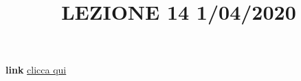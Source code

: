 \newline
\newline
\title{LEZIONE 14 1/04/2020}\newline
\textbf{link} \href{https://web.microsoftstream.com/video/7cfe3714-fd1e-453f-8394-f7abd4d747ad?list=user&userId=faa91214-a6f5-40d7-8875-253fd49b8ce1}{clicca qui}